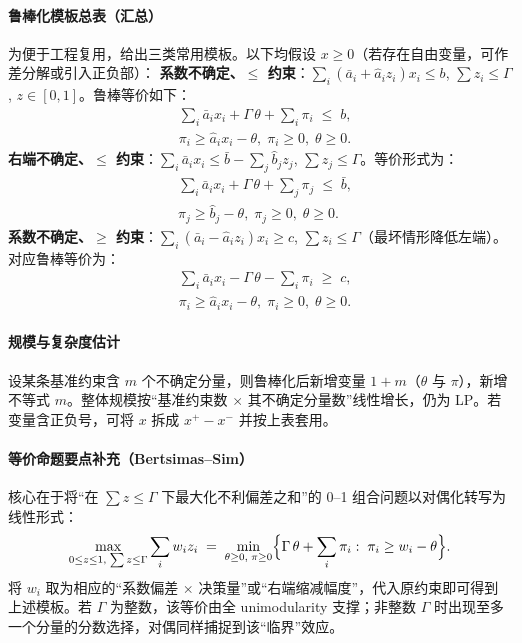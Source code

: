 \paragraph{鲁棒化模板总表（汇总）}
为便于工程复用，给出三类常用模板。以下均假设 $x\ge0$（若存在自由变量，可作差分解或引入正负部）：
{\setlength{\emergencystretch}{2em}
\textbf{系数不确定、$\le$ 约束}：$\sum_i (\bar a_i+\hat a_i z_i) x_i \le b$, $\sum z_i\le\Gamma$, $z\in[0,1]$。鲁棒等价如下：}
\begin{align}
  &\sum_i \bar a_i x_i + \Gamma\,\theta + \sum_i \pi_i \;\le\; b,\\
  &\pi_i \ge \hat a_i x_i - \theta,\; \pi_i\ge0,\; \theta\ge0.\nonumber
\end{align}
{\setlength{\emergencystretch}{2em}
\textbf{右端不确定、$\le$ 约束}：$\sum_i \bar a_i x_i \le \bar b - \sum_j \hat b_j z_j$, $\sum z_j\le\Gamma$。等价形式为：}
\begin{align}
  &\sum_i \bar a_i x_i + \Gamma\,\theta + \sum_j \pi_j \;\le\; \bar b,\\
  &\pi_j \ge \hat b_j - \theta,\; \pi_j\ge0,\; \theta\ge0.\nonumber
\end{align}
{\setlength{\emergencystretch}{2em}
\textbf{系数不确定、$\ge$ 约束}：$\sum_i (\bar a_i-\hat a_i z_i) x_i \ge c$, $\sum z_i\le\Gamma$（最坏情形降低左端）。对应鲁棒等价为：}
\begin{align}
  &\sum_i \bar a_i x_i - \Gamma\,\theta - \sum_i \pi_i \;\ge\; c,\\
  &\pi_i \ge \hat a_i x_i - \theta,\; \pi_i\ge0,\; \theta\ge0.\nonumber
\end{align}

\paragraph{规模与复杂度估计}
设某条基准约束含 $m$ 个不确定分量，则鲁棒化后新增变量 $1+m$（$\theta$ 与 $\pi$），新增不等式 $m$。整体规模按“基准约束数 $\times$ 其不确定分量数”线性增长，仍为 LP。若变量含正负号，可将 $x$ 拆成 $x^+-x^-$ 并按上表套用。

\paragraph{等价命题要点补充（Bertsimas–Sim）}
核心在于将“在 $\sum z\le\Gamma$ 下最大化不利偏差之和”的 0--1 组合问题以对偶化转写为线性形式：
\begin{equation}
  \max_{0\le z\le1,\;\sum z\le\Gamma} \sum_i w_i z_i
  \;=\; \min_{\theta\ge0,\;\pi\ge0}\Bigl\{\Gamma\,\theta+\sum_i\pi_i:\;\pi_i\ge w_i-\theta\Bigr\}.
\end{equation}
将 $w_i$ 取为相应的“系数偏差 $\times$ 决策量”或“右端缩减幅度”，代入原约束即可得到上述模板。若 $\Gamma$ 为整数，该等价由全 unimodularity 支撑；非整数 $\Gamma$ 时出现至多一个分量的分数选择，对偶同样捕捉到该“临界”效应。

